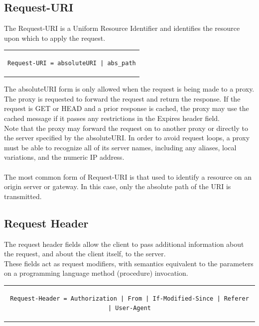 \subsection{Request-URI}
The Request-URI is a Uniform Resource Identifier and identifies the resource upon which to apply the request.
\begin{center}
\begin{tabular}{c}
\begin{lstlisting}[linewidth=190pt, basicstyle=\footnotesize\sffamily,]
Request-URI = absoluteURI | abs_path
\end{lstlisting}
\end{tabular}
\end{center}
The absoluteURI form is only allowed when the request is being made to a proxy. The proxy is requested to forward the request and return the response. If the request is GET or HEAD and a prior response is cached, the proxy may use the cached message if it passes any restrictions in the Expires header field.\\
Note that the proxy may forward the request on to another proxy or directly to the server specified by the absoluteURI. In order to avoid request loops, a proxy must be able to recognize all of its server names, including any aliases, local variations, and the numeric IP address.\\\\
The most common form of Request-URI is that used to identify a resource on an origin server or gateway. In this case, only the absolute path of the URI is transmitted.

\subsection{Request Header}
The request header fields allow the client to pass additional information about the request, and about the client itself, to the server.\\
These fields act as request modifiers, with semantics equivalent to the parameters on a programming language method (procedure) invocation.
\begin{center}
\begin{tabular}{c}
\begin{lstlisting}[linewidth=410pt, basicstyle=\footnotesize\sffamily,]
Request-Header = Authorization | From | If-Modified-Since | Referer | User-Agent
\end{lstlisting}
\end{tabular}
\end{center} 

